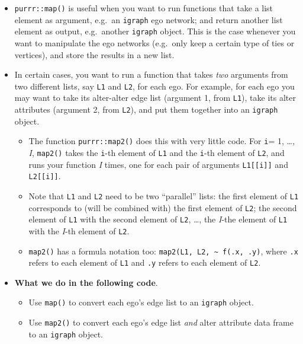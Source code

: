 \documentclass[
]{book}
\providecommand{\tightlist}{%
  \setlength{\itemsep}{0pt}\setlength{\parskip}{0pt}}
\begin{document}
\begin{itemize}
\tightlist
\item
  \texttt{purrr::map()} is useful when you want to run functions that take a list element as argument, e.g.~an \texttt{igraph} ego network; and return another list element as output, e.g.~another \texttt{igraph} object. This is the case whenever you want to manipulate the ego networks (e.g.~only keep a certain type of ties or vertices), and store the results in a new list.
\item
  In certain cases, you want to run a function that takes \emph{two} arguments from two different lists, say \texttt{L1} and \texttt{L2}, for each ego. For example, for each ego you may want to take its alter-alter edge list (argument 1, from \texttt{L1}), take its alter attributes (argument 2, from \texttt{L2}), and put them together into an \texttt{igraph} object.

  \begin{itemize}
  \tightlist
  \item
    The function \texttt{purrr::map2()} does this with very little code. For \texttt{i}= 1, \ldots, \emph{I}, \texttt{map2()} takes the \texttt{i}-th element of \texttt{L1} and the \texttt{i}-th element of \texttt{L2}, and runs your function \emph{I} times, one for each pair of arguments \texttt{L1{[}{[}i{]}{]}} and \texttt{L2{[}{[}i{]}{]}}.
  \item
    Note that \texttt{L1} and \texttt{L2} need to be two ``parallel'' lists: the first element of \texttt{L1} corresponds to (will be combined with) the first element of \texttt{L2}; the second element of \texttt{L1} with the second element of \texttt{L2}, \ldots, the \emph{I}-the element of \texttt{L1} with the \emph{I}-th element of \texttt{L2}.
  \item
    \texttt{map2()} has a formula notation too: \texttt{map2(L1,\ L2,\ \textasciitilde{}\ f(.x,\ .y)}, where \texttt{.x} refers to each element of \texttt{L1} and \texttt{.y} refers to each element of \texttt{L2}.
  \end{itemize}
\item
  \textbf{What we do in the following code}.

  \begin{itemize}
  \tightlist
  \item
    Use \texttt{map()} to convert each ego's edge list to an \texttt{igraph} object.
  \item
    Use \texttt{map2()} to convert each ego's edge list \emph{and} alter attribute data frame to an \texttt{igraph} object.
  \end{itemize}
\end{itemize}
\end{document}
